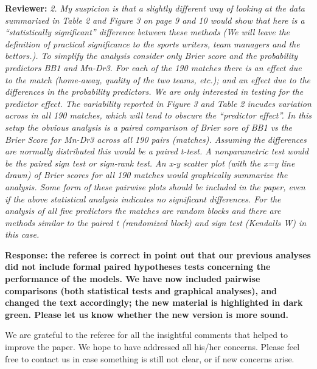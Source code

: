 \documentclass[11pt]{article}
\begin{document}
\vspace{6mm}

\hspace{4mm} \textbf{Reviewer:} \textit{2. My suspicion is that a slightly different way of looking at the data summarized in
Table 2 and Figure 3 on page 9 and 10 would show that here is a ``statistically significant'' difference between these methods (We will leave the definition of practical significance
to the sports writers, team managers and the bettors.). To simplify the analysis consider only Brier score and the probability predictors BB1 and Mn-Dr3. For each of the 190 matches there is an effect due to the match (home-away, quality of the two teams, etc.); and an effect due to the differences in the probability predictors. We are only interested in testing for the predictor effect. The variability reported in Figure 3 and Table 2
incudes variation across in all 190 matches, which will tend to obscure the ``predictor effect''. In this setup the obvious analysis is a paired comparison of Brier sore of BB1 vs the Brier Score for Mn-Dr3 across all 190 pairs (matches). Assuming the differences
are normally distributed this would be a paired t-test. A nonparametric test would be the paired sign test or sign-rank test. An x-y scatter plot (with the x=y line drawn) of Brier scores for all 190 matches would graphically summarize the analysis. Some form of
these pairwise plots should be included in the paper, even if the above statistical analysis indicates no significant differences.
For the analysis of all five predictors the matches are random blocks and there are methods similar to the paired t (randomized block) and sign test (Kendalls W) in this case.}

\vspace{2mm}
{\bf Response: the referee is correct in point out that our previous analyses did not include formal paired hypotheses tests concerning the performance of the models. We have now included pairwise comparisons (both statistical tests and graphical analyses), and changed the text accordingly; the new material is highlighted in dark green. Please let us know whether the new version is more sound.

We are grateful to the referee for all the insightful comments that helped to improve the paper. We hope to have addressed all his/her concerns. Please feel free to contact us in case something is still not clear, or if new concerns arise.} 
\end{document}
